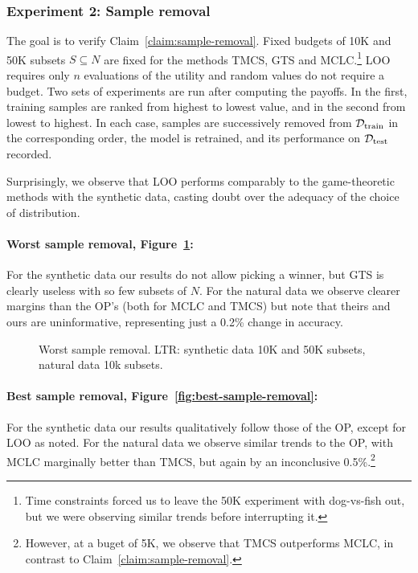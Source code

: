 \subsubsection{Experiment 2: Sample removal}\label{sec:result-sample-removal}

The goal is to verify Claim~\ref{claim:sample-removal}. Fixed budgets of 10K
and 50K subsets $S \subseteq N$ are fixed for the methods TMCS, GTS and
MCLC.\footnote{Time constraints forced us to leave the 50K experiment with
dog-vs-fish out, but we were observing similar trends before interrupting it.}
LOO requires only $n$ evaluations of the utility and random values do not
require a budget. Two sets of experiments are run after computing the payoffs.
In the first, training samples are ranked from highest to lowest value, and in
the second from lowest to highest. In each case, samples are successively
removed from $\mathcal{D}_{\operatorname{train}}$ in the corresponding order, the
model is retrained, and its performance on $\mathcal{D}_{\operatorname{test}}$
recorded.

Surprisingly, we observe that LOO performs comparably to the game-theoretic
methods with the synthetic data, casting doubt over the adequacy of the choice
of distribution.

\paragraph{Worst sample removal, Figure~\ref{fig:worst-sample-removal}:} For
the synthetic data our results do not allow picking a winner, but GTS is
clearly useless with so few subsets of $N$. For the natural data we observe
clearer margins than the OP's (both for MCLC and TMCS) but note that theirs
and ours are uninformative, representing just a 0.2\% change in accuracy.

\begin{figure}[h]
  \hspace*{-3mm}
  \caption{\label{fig:worst-sample-removal}Worst sample removal. LTR:
  synthetic data 10K and 50K subsets, natural data 10k subsets.}
\end{figure}

\paragraph{Best sample removal, Figure~\ref{fig:best-sample-removal}:}For the
synthetic data our results qualitatively follow those of the OP, except for
LOO as noted. For the natural data we observe similar trends to the OP, with
MCLC marginally better than TMCS, but again by an inconclusive
0.5\%.\footnote{However, at a buget of 5K, we observe that TMCS outperforms
MCLC, in contrast to Claim~\ref{claim:sample-removal}.}

